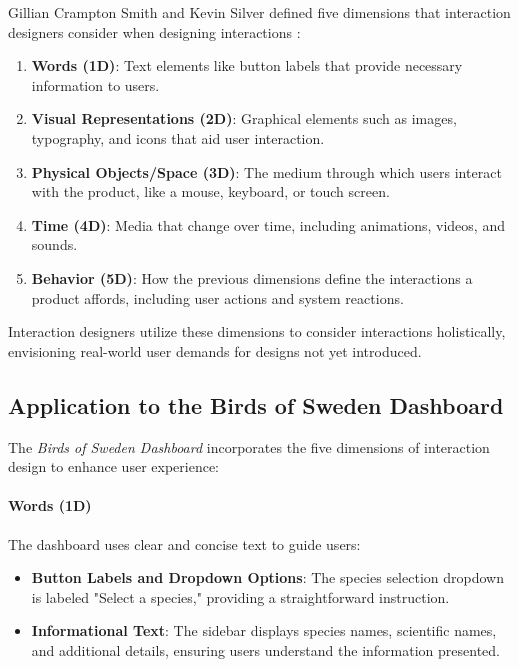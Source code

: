 Gillian Crampton Smith and Kevin Silver defined five dimensions that interaction designers consider when designing interactions \cite{WhatInteractionDesign2024}:

\begin{enumerate} 
    \item \textbf{Words (1D)}: Text elements like button labels that provide necessary information to users. 
    \item \textbf{Visual Representations (2D)}: Graphical elements such as images, typography, and icons that aid user interaction. 
    \item \textbf{Physical Objects/Space (3D)}: The medium through which users interact with the product, like a mouse, keyboard, or touch screen. 
    \item \textbf{Time (4D)}: Media that change over time, including animations, videos, and sounds. 
    \item \textbf{Behavior (5D)}: How the previous dimensions define the interactions a product affords, including user actions and system reactions. 
\end{enumerate}

Interaction designers utilize these dimensions to consider interactions holistically, envisioning real-world user demands for designs not yet introduced.

\subsection{Application to the Birds of Sweden Dashboard}

The \textit{Birds of Sweden Dashboard} incorporates the five dimensions of interaction design to enhance user experience:

\paragraph{Words (1D)}

The dashboard uses clear and concise text to guide users:

\begin{itemize} 
    \item \textbf{Button Labels and Dropdown Options}: The species selection dropdown is labeled "Select a species," providing a straightforward instruction. 
    \item \textbf{Informational Text}: The sidebar displays species names, scientific names, and additional details, ensuring users understand the information presented. 
\end{itemize}

